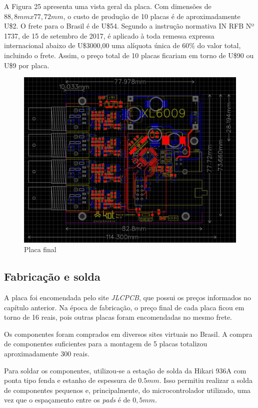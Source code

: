 \documentclass[
	12pt,				%
	openright,			%
	twoside,			%
	a4paper,			%
	english,			%
	french,				%
	spanish,			%
	brazil,				%
	]{abntex2}
\begin{document}
			A Figura 25 apresenta uma vista geral da placa. Com dimensões de
			$88,8mmx77,72mm$, o custo de produção de 10 placas é de
			aproximadamente U\$2. O frete para o Brasil é de U\$54. Segundo
			a instrução normativa IN RFB Nº 1737, de 15 de setembro de 2017,
			é aplicado à toda remessa expressa internacional abaixo de
			U\$3000,00 uma alíquota única de 60\% do valor total, incluindo
			o frete. Assim, o preço total de 10 placas ficariam em torno de
			U\$90 ou U\$9 por placa.

			\begin{figure}[!ht]
				\centering
				\includegraphics[width=\linewidth]{../Fotos/placaTotal.jpg}
				\caption{Placa final}
			\end{figure}

		\subsection{Fabricação e solda}
			A placa foi encomendada pelo site \textit{JLCPCB}, que possui os
			preços informados no capítulo anterior. Na época de fabricação, o
			preço final de cada placa ficou em torno de 16 reais, pois outras
			placas foram encomendadas no mesmo frete.

			Os componentes foram comprados em diversos sites virtuais no Brasil.
			A compra de componentes suficientes para a montagem de 5 placas
			totalizou aproximadamente 300 reais.

			Para soldar os componentes, utilizou-se a estação de solda da Hikari
			936A com ponta tipo fenda e estanho de espessura de $0.5mm$. Isso
			permitiu realizar a solda de componentes pequenos e, principalmente,
			do microcontrolador utilizado, uma vez que o espaçamento entre os
			\textit{pads} é de $0,5mm$.
\end{document}
